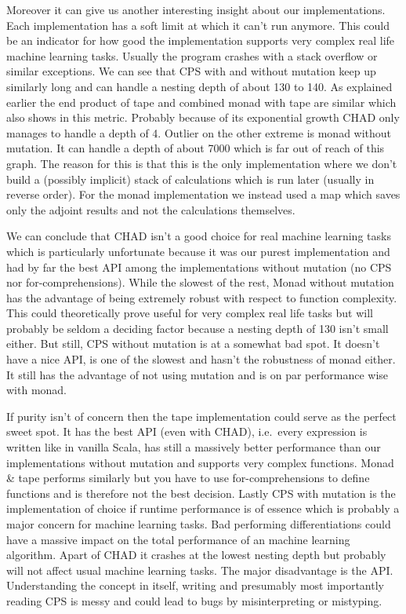 Moreover it can give us another interesting insight about our implementations. Each implementation has a soft limit at which it can't run anymore. This could be an indicator for how good the implementation supports very complex real life machine learning tasks.  Usually the program crashes with a stack overflow or similar exceptions. We can see that CPS with and without mutation keep up similarly long and can handle a nesting depth of about 130 to 140. As explained earlier the end product of tape and combined monad with tape are similar which also shows in this metric. Probably because of its exponential growth CHAD only manages to handle a depth of 4. Outlier on the other extreme is monad without mutation. It can handle a depth of about 7000 which is far out of reach of this graph. The reason for this is that this is the only implementation where we don't build a (possibly implicit) stack of calculations which is run later (usually in reverse order). For the monad implementation we instead used a map which saves only the adjoint results and not the calculations themselves.

We can conclude that CHAD isn't a good choice for real machine learning tasks which is particularly unfortunate because it was our purest implementation and had by far the best API among the implementations without mutation (no CPS nor for-comprehensions). While the slowest of the rest, Monad without mutation has the advantage of being extremely robust with respect to function complexity. This could theoretically prove useful for very complex real life tasks but will probably be seldom a deciding factor because a nesting depth of 130 isn't small either. But still, CPS without mutation is at a somewhat bad spot. It doesn't have a nice API, is one of the slowest and hasn't the robustness of monad either. It still has the advantage of not using mutation and is on par performance wise with monad.

If purity isn't of concern then the tape implementation could serve as the perfect sweet spot. It has the best API (even with CHAD), i.e.\ every expression is written like in vanilla Scala, has still a massively better performance than our implementations without mutation and supports very complex functions. Monad \& tape performs similarly but you have to use for-comprehensions to define functions and is therefore not the best decision. Lastly CPS with mutation is the implementation of choice if runtime performance is of essence which is probably a major concern for machine learning tasks. Bad performing differentiations could have a massive impact on the total performance of an machine learning algorithm. Apart of CHAD it crashes at the lowest nesting depth but probably will not affect usual machine learning tasks. The major disadvantage is the API. Understanding the concept in itself, writing and presumably most importantly reading CPS is messy and could lead to bugs by misinterpreting or mistyping.

